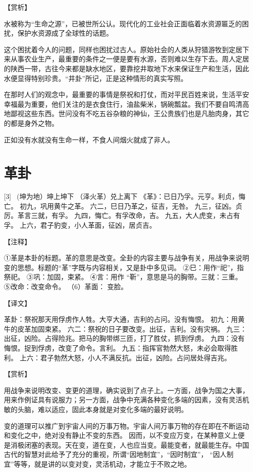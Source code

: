 \documentclass[12pt,UTF8]{ctexbook}
\begin{document}
【赏析】

水被称为“生命之源”，已被世所公认。现代化的工业社会正面临着水资源匾乏的困扰，保护水资源成了全球性的话题。

这个困扰着今人的问题，同样也困扰过古人。原始社会的人类从狩猎游牧到定居下来从事农业生产，最重要的条件之一便是要有水源，否则难以生存下去。周人定居的陕西一带，古往今来都是缺水地区，要靠挖井取地下水来保证生产和生活，因此水便显得特别珍贵。“井卦”所记，正是这种情形的真实写照。

在那时人们的观念中，最重要的事情是祭祝和打仗，而对平民百姓来说，生活平安幸福最为重要，他们关注的是衣食住行，油盐柴米，锅碗瓢盆。我们不要自鸣清高地鄙视这些东西。世问没有不吃五谷杂粮的神仙，王公贵族们也是凡胎肉身，其它的都是身外之物。

正如没有水就没有生命一样，不食人间烟火就成了非人。

\chapter{革卦}
[3] \ (坤为地）坤上坤下
（泽火革）兑上离下
《革》：已日乃孚。元亨。利贞，悔亡。
初九，巩用黄牛之革。
六二，巳日乃革之，征吉，无咎。
九三，征凶。贞厉。革言三就，有孚。
九四，悔亡。有孚改命，吉。
九五，大人虎变，未占有孚。
上六，君子豹变，小人革面，征凶，居贞吉。

【注释】

①革是本卦的标题。革的意思是改变。全卦的内容主要与战争有关，用战争来说明变的思想。标题的“革”字既与内容相关，又是卦中多见词。
②巳：用作“祀”，指祭祀。
③巩：加固，束紧。
④言：用作 “靳”，意思是马的胸带。三就：三重。
⑤改命：改变命令。
（6）革面： 变脸。

【译文】

革卦：祭祝那天用俘虏作人牲。大亨大通，吉利的占问。没有悔恨。
初九：用黄牛的皮革加固束紧。
六二：祭祝的日子要改变。出征，吉利。没有灾祸。
九三：出征，凶险。占得险兆。把马的胸带绑三匝，打了胜仗，抓到俘虏。
九四：没有悔恨。捉到俘虏，改变了命令。言利。
九五：指挥官勃然大怒，未必会取得胜利。
上六：君子勃然大怒，小人不满反抗。出征，凶险。占问居处得吉兆。

【赏析】

用战争来说明改变、变更的道理，确实说到了点子上。一方面，战争为国之大事，用来作例证具有说服力；另一方面，战争中充满各种变化多端的因素，没有灵活机敏的头脑，难以适应，固此本身就是对变化多端的最好说明。

变的道理可以推广到宇宙人间的万事万物。宇宙人间万事万物的存在即在不断运动和变化之中，绝对没有静止不变的东西。 因而，以不变应万变，在某种意义上便是消极闭塞的表现。天在变，道在变，人也应当变。最能变者，就最能生存。中国古代的智慧对此给予了充分的重视，所谓“因地制宜”，“因时制宜”， “因人制宜”等等，就是讲的以变对变，灵活机动，才能立于不败之地。
\end{document}
